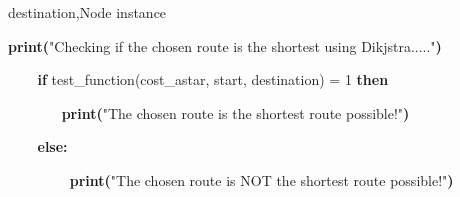 \documentclass[12pt]{article}
\begin{document}
\begin{adjustwidth}{0.5in}{0.0in}
\begin{justify}
 \tabto{0.75in} \tab {}
\end{justify}\par

\end{adjustwidth}

\begin{adjustwidth}{0.5in}{0.0in}
\begin{justify}
{\fontsize{8pt}{9.6pt}\selectfont  \tabto{0.75in} \tab \tab destination,Node instance\par}
\end{justify}\par

\end{adjustwidth}

\tab \tab \tab \tab 
\vspace{\baselineskip}\begin{justify}
{\fontsize{8pt}{9.6pt}\selectfont \textbf{ \tabto{0.75in} print(}"Checking if the chosen route is the shortest using Dikjstra....."\textbf{)}\par}
\end{justify}\par

\begin{justify}
{\fontsize{8pt}{9.6pt}\selectfont \textbf{\ \ \   \tabto{0.75in} if }test\_function(cost\_astar, start, destination) = 1\textbf{ then}\par}
\end{justify}\par

\begin{justify}
{\fontsize{8pt}{9.6pt}\selectfont \textbf{\ \ \ \ \ \   \tabto{0.75in} \tab  print(}"The chosen route is the shortest route possible!"\textbf{)}\par}
\end{justify}\par

\begin{justify}
{\fontsize{8pt}{9.6pt}\selectfont \textbf{\ \ \   \tabto{0.75in} else:}\par}
\end{justify}\par

\begin{justify}
{\fontsize{8pt}{9.6pt}\selectfont \textbf{\ \ \ \ \ \ \   \tabto{0.75in} \tab print(}"The chosen route is NOT the shortest route possible!"\textbf{)}\par}
\end{justify}\par
\end{document}

